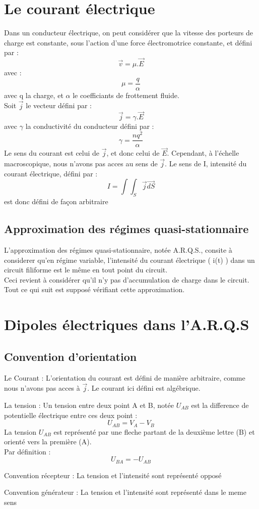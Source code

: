 \chapter{Le courant électrique}
Dans un conducteur électrique, on peut considérer que la vitesse des porteurs de charge est constante, sous l'action d'une force électromotrice constante, et défini par :
$$\overrightarrow{v} = \mu.\overrightarrow{E}$$
avec : $$\mu = \dfrac{q}{\alpha}$$
avec q la charge, et $\alpha$ le coefficiants de frottement fluide.\\
Soit $\overrightarrow{j}$ le vecteur défini par :
$$\overrightarrow{j} = \gamma.\overrightarrow{E}$$
avec $\gamma$ la conductivité du conducteur défini par :
$$\gamma = \dfrac{nq^2}{\alpha}$$
Le sens du courant est celui de $\overrightarrow{j}$, et donc celui de $\overrightarrow{E}$. Cependant, à l'échelle macroscopique, nous n'avons pas acces au sens de $\overrightarrow{j}$. Le sens de I, intensité du courant électrique, défini par :
$$I = \int\int_S \overrightarrow{j}\overrightarrow{dS}$$
est donc défini de façon arbitraire
\section{Approximation des régimes quasi-stationnaire}
L'approximation des régimes quasi-stationnaire, notée A.R.Q.S., consite à considerer qu'en régime variable, l'intensité du courant électrique ( i(t) ) dans un circuit filiforme est le même en tout point du circuit.\\
Ceci revient à considérer qu'il n'y pas d'accumulation de charge dans le circuit.\\
Tout ce qui suit est supposé vérifiant cette approximation.
\chapter{Dipoles électriques dans l'A.R.Q.S}
\section{Convention d'orientation}
\begin{conv}
Le Courant : L'orientation du courant est défini de manière arbitraire, comme nous n'avons pas acces à $\overrightarrow{j}$. Le courant ici défini est algébrique.
\end{conv}
\begin{conv}
La tension : Un tension entre deux point A et B, notée $U_{AB}$ est la difference de potentielle électrique entre ces deux point :
$$U_{AB} = V_A-V_B$$
La tension $U_{AB}$ est représenté par une fleche partant de la deuxième lettre (B) et orienté vers la première (A).\\
Par définition :
$$U_{BA} = - U_{AB}$$
\end{conv}
\begin{conv}
Convention récepteur : La tension et l'intensité sont représenté opposé
\end{conv}
\begin{conv}
Convention générateur : La tension et l'intensité sont représenté dans le meme sens
\end{conv}
